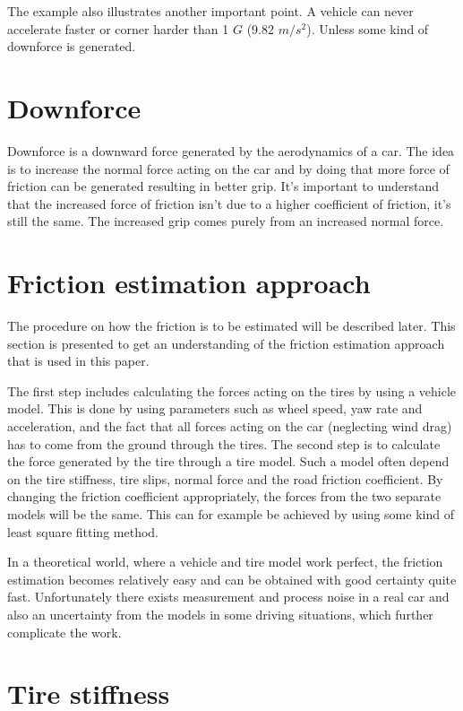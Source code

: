 The example also illustrates another important point. A vehicle can never accelerate faster or corner harder than 1 $ G $ (9.82 $ m/s^2 $). Unless some kind of downforce is generated. 

\section{Downforce}
Downforce is a downward force generated by the aerodynamics of a car. The idea is to increase the normal force acting on the car and by doing that more force of friction can be generated resulting in better grip. It's important to understand that the increased force of friction isn't due to a higher coefficient of friction, it's still the same. The increased grip comes purely from an increased normal force.

\section{Friction estimation approach}

The procedure on how the friction is to be estimated will be described later. This section is presented to get an understanding of the friction estimation approach that is used in this paper.

The first step includes calculating the forces acting on the tires by using a vehicle model. This is done by using parameters such as wheel speed, yaw rate and acceleration, and the fact that all forces acting on the car (neglecting wind drag) has to come from the ground through the tires. The second step is to calculate the force generated by the tire through a tire model. Such a model often depend on the tire stiffness, tire slips, normal force and the road friction coefficient. By changing the friction coefficient appropriately, the forces from the two separate models will be the same. This can for example be achieved by using some kind of least square fitting method. 

In a theoretical world, where a vehicle and tire model work perfect, the friction estimation becomes relatively easy and can be obtained with good certainty quite fast. Unfortunately there exists measurement and process noise in a real car and also an uncertainty from the models in some driving situations, which further complicate the work.

\section{Tire stiffness}

